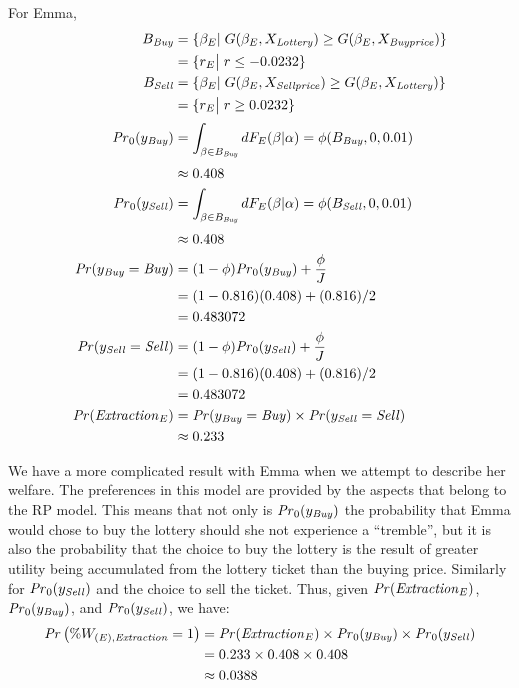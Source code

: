 \documentclass[../main.tex]{subfiles}
\begin{document}
\noindent For Emma,
\begin{align}
	\label{eq2:Emma}
	\begin{split}
		B_{\mathit{Buy}} &= \{ \beta_E |\; G(\beta_E,X_{\mathit{Lottery}}) \geq G(\beta_E,X_{\mathit{Buy price}})\}\\
		&= \{ r_E \big|\; r \leq -0.0232 \} \\
		B_{\mathit{Sell}} &= \{ \beta_E |\; G(\beta_E,X_{\mathit{Sell price}}) \geq G(\beta_E,X_{\mathit{Lottery}})\}\\
		&= \{ r_E \big|\; r \geq 0.0232 \} \\[0.5ex]
		{\ensuremath{\mathit{Pr}}}_0(y_{\mathit{Buy}}) &= \int_{\beta \in B_{\mathit{Buy}}} dF_E(\beta|\alpha) = \phi(B_{\mathit{Buy}},0,0.01)\\[0.5ex]
		&\approx 0.408 \\
		{\mathit{Pr}}_0(y_{\mathit{Sell}}) &= \int_{\beta \in B_{\mathit{Buy}}} dF_E(\beta|\alpha) = \phi(B_{\mathit{Sell}},0,0.01)\\[0.5ex]
		&\approx 0.408 \\
		{\mathit{Pr}}(y_{\mathit{Buy}}=\mathit{Buy}) &= (1-\phi) {\mathit{Pr}}_0(y_{\mathit{Buy}}) + \frac{\phi}{J}\\
		&=(1-0.816)(0.408) + (0.816)/2\\
		&= 0.483072\\
		{\mathit{Pr}}(y_{\mathit{Sell}}=\mathit{Sell}) &= (1-\phi) {\mathit{Pr}}_0(y_{\mathit{Sell}}) + \frac{\phi}{J}\\
		&=(1-0.816)(0.408) + (0.816)/2\\
		&= 0.483072\\
		{\mathit{Pr}}(\mathit{Extraction}_E) &= {\mathit{Pr}}(y_{\mathit{Buy}} = \mathit{Buy}) \times {\ensuremath{\mathit{Pr}}}(y_{\mathit{Sell}} = \mathit{Sell})\\
		&\approx 0.233
	\end{split}
\end{align}

We have a more complicated result with Emma when we attempt to describe her welfare. 
The preferences in this model are provided by the aspects that belong to the RP model.
This means that not only is ${\mathit{Pr}}_0(y_{\mathit{Buy}})$ the probability that Emma would chose to buy the lottery should she not experience a \enquote{tremble}, but it is also the probability that the choice to buy the lottery is the result of greater utility being accumulated from the lottery ticket than the buying price.
Similarly for ${\mathit{Pr}}_0(y_{\mathit{Sell}})$ and the choice to sell the ticket.
Thus, given ${\mathit{Pr}}(\mathit{Extraction}_E)$, ${\mathit{Pr}}_0(y_{\mathit{Buy}})$, and ${\mathit{Pr}}_0(y_{\mathit{Sell}})$, we have:
\begin{align}
	\begin{split}
		{\ensuremath{\mathit{Pr}}}\left(\% W_{(E),\mathit{Extraction}} = 1\right) &= {\mathit{Pr}}(\mathit{Extraction}_E) \times {\ensuremath{\mathit{Pr}}}_0(y_{\mathit{Buy}}) \times {\ensuremath{\mathit{Pr}}}_0(y_{\mathit{Sell}})\\
		&= 0.233 \times 0.408 \times 0.408\\
		&\approx 0.0388
	\end{split}
\end{align}
\end{document}
